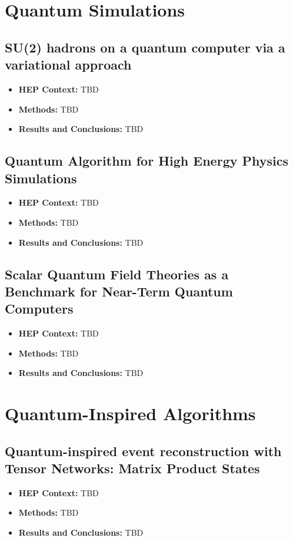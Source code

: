 \section{Quantum Simulations}

\subsection{SU(2) hadrons on a quantum computer via a variational approach~\cite{Atas:2021ext}}
\begin{itemize}
	\item \textbf{HEP Context: }TBD
	\item \textbf{Methods: }TBD
	\item \textbf{Results and Conclusions: }TBD
\end{itemize}\subsection{Quantum Algorithm for High Energy Physics Simulations~\cite{Bauer:2019qxa}}
\begin{itemize}
	\item \textbf{HEP Context: }TBD
	\item \textbf{Methods: }TBD
	\item \textbf{Results and Conclusions: }TBD
\end{itemize}\subsection{Scalar Quantum Field Theories as a Benchmark for Near-Term Quantum Computers~\cite{Yeter-Aydeniz:2018mix}}
\begin{itemize}
	\item \textbf{HEP Context: }TBD
	\item \textbf{Methods: }TBD
	\item \textbf{Results and Conclusions: }TBD
\end{itemize}

\section{Quantum-Inspired Algorithms}

\subsection{Quantum-inspired event reconstruction with Tensor Networks: Matrix Product States~\cite{Araz:2021zwu}}
\begin{itemize}
	\item \textbf{HEP Context: }TBD
	\item \textbf{Methods: }TBD
	\item \textbf{Results and Conclusions: }TBD
\end{itemize}

